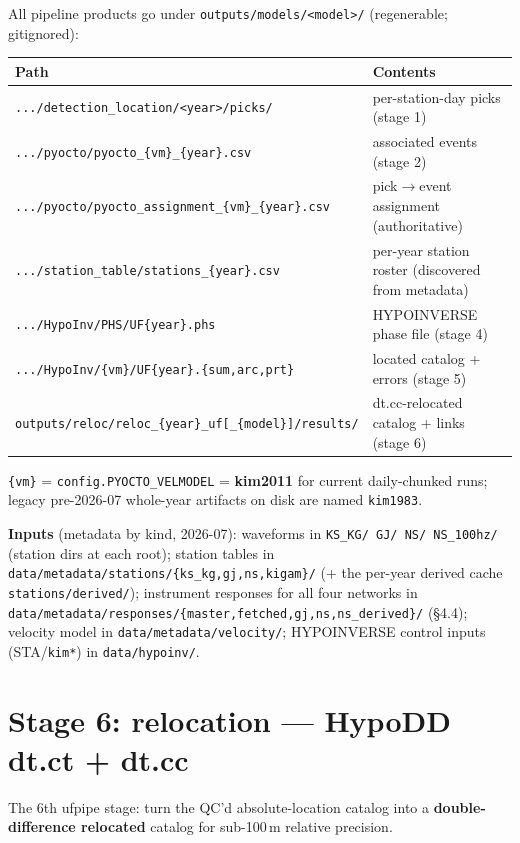 \documentclass[11pt]{article}
\newcommand{\code}[1]{\texttt{#1}}
\begin{document}
All pipeline products go under \code{outputs/models/<model>/} (regenerable; gitignored):
\begin{center}
\small
\begin{tabular}{@{}ll@{}}
\toprule
Path & Contents \\
\midrule
\code{.../detection\_location/<year>/picks/} & per-station-day picks (stage 1) \\
\code{.../pyocto/pyocto\_\{vm\}\_\{year\}.csv} & associated events (stage 2) \\
\code{.../pyocto/pyocto\_assignment\_\{vm\}\_\{year\}.csv} & pick$\rightarrow$event assignment (authoritative) \\
\code{.../station\_table/stations\_\{year\}.csv} & per-year station roster (discovered from metadata) \\
\code{.../HypoInv/PHS/UF\{year\}.phs} & HYPOINVERSE phase file (stage 4) \\
\code{.../HypoInv/\{vm\}/UF\{year\}.\{sum,arc,prt\}} & located catalog + errors (stage 5) \\
\code{outputs/reloc/reloc\_\{year\}\_uf[\_\{model\}]/results/} & dt.cc-relocated catalog + links (stage 6) \\
\bottomrule
\end{tabular}
\end{center}
\noindent \code{\{vm\}} = \code{config.PYOCTO\_VELMODEL} = \textbf{kim2011} for current daily-chunked runs;
legacy pre-2026-07 whole-year artifacts on disk are named \code{kim1983}.

\medskip
\noindent\textbf{Inputs} (metadata by kind, 2026-07): waveforms in \code{KS\_KG/ GJ/ NS/ NS\_100hz/} (station
dirs at each root); station tables in \code{data/metadata/stations/\{ks\_kg,gj,ns,kigam\}/} (+ the per-year
derived cache \code{stations/derived/}); instrument responses for all four networks in
\code{data/metadata/responses/\{master,fetched,gj,ns,ns\_derived\}/} (\S4.4); velocity
model in \code{data/metadata/velocity/}; HYPOINVERSE control inputs (STA/\code{kim*}) in \code{data/hypoinv/}.

\section{Stage 6: relocation — HypoDD dt.ct + dt.cc}

The 6th ufpipe stage: turn the QC'd absolute-location catalog into a \textbf{double-difference relocated} catalog
for sub-100\,m relative precision.
\end{document}
